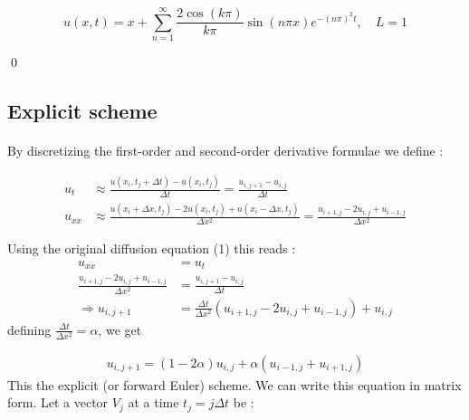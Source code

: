 \documentclass[a4paper, twoside, 11pt]{report}
\theoremstyle{theorem}
\theoremstyle{remark}
\theoremstyle{exemple}
\begin{document}
                    \begin{equation*}
                         u(x,t)=x + \sum\limits_{n=1}^{\infty}\frac{2\cos(k\pi)}{k\pi}\sin(n\pi x)e^{-(n\pi)^2t}, \quad L=1
                         \tag{3}
                    \end{equation*}

                    \qed

            \subsection{Explicit scheme}

                \paragraph{}By discretizing the first-order and second-order derivative formulae we define :

                    \begin{align*}
                        u_t &\approx \frac{u(x_i,t_j + \Delta t)-u(x_i,t_j)}{\Delta t} =                                                                 \frac{u_{i,j+1}-u_{i,j}}{\Delta t}\\
                        u_{xx} &\approx \frac{u(x_i + \Delta x,t_j)-2u(x_i,t_j)+u(x_i - \Delta x,t_j)}{\Delta x^2} = \frac{u_{i+1,j}-2u_{i,j}+u_{i-1,j}}{\Delta x^2}
                    \end{align*}

                    Using the original diffusion equation (1) this reads :
%
                    \begin{align*}
                        u_{xx}&=u_t\\
                        \frac{u_{i+1,j}-2u_{i,j}+u_{i-1,j}}{\Delta x^2}&=\frac{u_{i,j+1}-u_{i,j}}{\Delta t}\\
                        \Longrightarrow u_{i,j+1}&=\frac{\Delta t}{\Delta x^2}(u_{i+1,j}-2u_{i,j}+u_{i-1,j})+u_{i,j}
                    \end{align*}
                    defining $\displaystyle \frac{\Delta t}{\Delta x^2}=\alpha$, we get

                    \begin{align*}
                        u_{i,j+1}=(1-2\alpha)u_{i,j}+\alpha(u_{i-1,j}+u_{i+1,j})
                        \tag{4}
                    \end{align*}
                    This the explicit (or forward Euler) scheme. We can write this equation in matrix form. Let a vector $V_j$ at a time $t_j=j\Delta t$ be :
\end{document}
